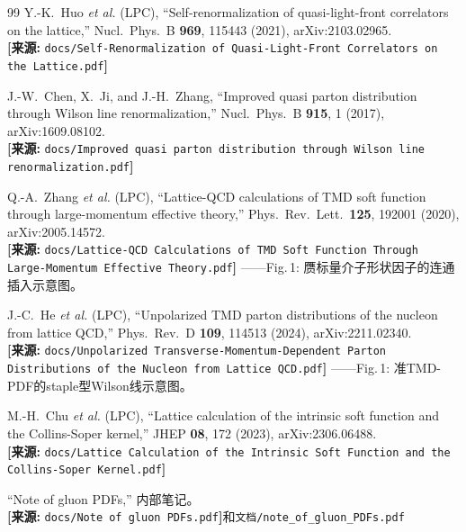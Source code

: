 \documentclass[12pt,a4paper]{ctexart}
\begin{document}
\begin{thebibliography}{99}
Y.-K.~Huo \textit{et al.} (LPC),
``Self-renormalization of quasi-light-front correlators on the lattice,''
Nucl.\ Phys.\ B \textbf{969}, 115443 (2021), arXiv:2103.02965.
\\\textbf{[来源:} \texttt{docs/Self-Renormalization of Quasi-Light-Front Correlators on the Lattice.pdf}\textbf{]}

J.-W.~Chen, X.~Ji, and J.-H.~Zhang,
``Improved quasi parton distribution through Wilson line renormalization,''
Nucl.\ Phys.\ B \textbf{915}, 1 (2017), arXiv:1609.08102.
\\\textbf{[来源:} \texttt{docs/Improved quasi parton distribution through Wilson line renormalization.pdf}\textbf{]}

Q.-A.~Zhang \textit{et al.} (LPC),
``Lattice-QCD calculations of TMD soft function through large-momentum effective theory,''
Phys.\ Rev.\ Lett.\ \textbf{125}, 192001 (2020), arXiv:2005.14572.
\\\textbf{[来源:} \texttt{docs/Lattice-QCD Calculations of TMD Soft Function Through Large-Momentum Effective Theory.pdf}\textbf{]}
——Fig.\,1: 赝标量介子形状因子的连通插入示意图。

J.-C.~He \textit{et al.} (LPC),
``Unpolarized TMD parton distributions of the nucleon from lattice QCD,''
Phys.\ Rev.\ D \textbf{109}, 114513 (2024), arXiv:2211.02340.
\\\textbf{[来源:} \texttt{docs/Unpolarized Transverse-Momentum-Dependent Parton Distributions of the Nucleon from Lattice QCD.pdf}\textbf{]}
——Fig.\,1: 准TMD-PDF的staple型Wilson线示意图。

M.-H.~Chu \textit{et al.} (LPC),
``Lattice calculation of the intrinsic soft function and the Collins-Soper kernel,''
JHEP \textbf{08}, 172 (2023), arXiv:2306.06488.
\\\textbf{[来源:} \texttt{docs/Lattice Calculation of the Intrinsic Soft Function and the Collins-Soper Kernel.pdf}\textbf{]}

``Note of gluon PDFs,'' 内部笔记。
\\\textbf{[来源:} \texttt{docs/Note of gluon PDFs.pdf}\textbf{]}和\texttt{文档/note\_of\_gluon\_PDFs.pdf}

\end{thebibliography}
\end{document}
